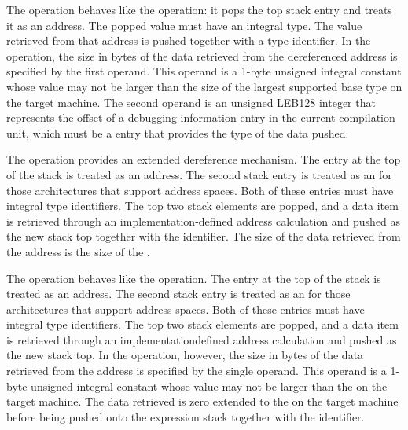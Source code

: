 \begin{enumerate}[1. ]
\itembfnl{\DWOPdereftypeTARG}
The \DWOPdereftypeNAME{} operation behaves like the \DWOPderefsize{} operation:
it pops the top stack entry and treats it as an address. 
The popped value must have an integral type.
The value retrieved from that address is pushed together with a type identifier. 
In the \DWOPdereftypeNAME{} operation, the size in
bytes of the data retrieved from the dereferenced address is specified by
the first operand. This operand is a 1-byte unsigned integral constant whose
value may not be larger than the size of the largest supported base type on
the target machine. The second operand is an unsigned LEB128 integer that
represents the offset of a debugging information entry in the current
compilation unit, which must be a \DWTAGbasetype{} entry that provides the
type of the data pushed.

\itembfnl{\DWOPxderefTARG}
The \DWOPxderefNAME{} operation provides an extended dereference
mechanism. The entry at the top of the stack is treated as an
address. The second stack entry is treated as an  for those architectures that support
address spaces. 
Both of these entries must have integral type identifiers.
The top two stack elements are popped,
and a data item is retrieved through an implementation-defined
address calculation and pushed as the new stack top together with the
\specialaddresstype{} identifier.
The size of the data retrieved from the 
address is the size of the \specialaddresstype.

\itembfnl{\DWOPxderefsizeTARG}
The \DWOPxderefsizeNAME{} operation behaves like the
\DWOPxderef{} operation. The entry at the top of the stack is
treated as an address. The second stack entry is treated as
an  for those architectures
that support 
address spaces. 
Both of these entries must have integral type identifiers.
The top two stack
elements are popped, and a data item is retrieved through an
implementation\dash defined address calculation and pushed as the
new stack top. In the \DWOPxderefsizeNAME{} operation, however,
the size in bytes of the data retrieved from the 
address is specified by the single operand. This operand is a
1-byte unsigned integral constant whose value may not be larger
than the  on the target machine. The data
retrieved is zero extended to the  on the
target machine before being pushed onto the expression stack together
with the \specialaddresstype{} identifier.


\end{enumerate}

